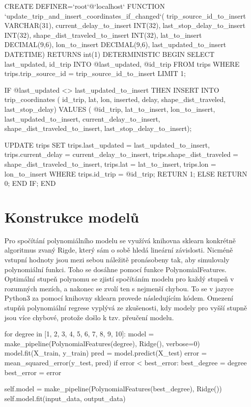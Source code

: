 \begin{code}[frame=none]
CREATE DEFINER=`root`@`localhost` FUNCTION
  `update_trip_and_insert_coordinates_if_changed`(
  trip_source_id_to_insert VARCHAR(31),
  current_delay_to_insert INT(32),
    last_stop_delay_to_insert INT(32),
  shape_dist_traveled_to_insert INT(32),
  lat_to_insert DECIMAL(9,6),
  lon_to_insert DECIMAL(9,6),
  last_updated_to_insert DATETIME) RETURNS int(1)
    DETERMINISTIC
BEGIN
  SELECT last_updated, id_trip
  INTO @last_updated, @id_trip
  FROM trips
  WHERE trips.trip_source_id = trip_source_id_to_insert
  LIMIT 1;


  IF @last_updated <> last_updated_to_insert THEN
    INSERT INTO trip_coordinates (
      id_trip,
      lat,
      lon,
      inserted,
      delay,
      shape_dist_traveled,
      last_stop_delay)
    VALUES (
      @id_trip,
      lat_to_insert,
      lon_to_insert,
      last_updated_to_insert,
      current_delay_to_insert,
      shape_dist_traveled_to_insert,
      last_stop_delay_to_insert);


    UPDATE trips
    SET trips.last_updated = last_updated_to_insert,
      trips.current_delay = current_delay_to_insert,
      trips.shape_dist_traveled = shape_dist_traveled_to_insert,
      trips.lat = lat_to_insert,
      trips.lon = lon_to_insert
    WHERE trips.id_trip = @id_trip;
        RETURN 1;
  ELSE
    RETURN 0;
  END IF;
END
\end{code}




\section{Konstrukce modelů} \label{section:konstrukce_modelu}


Pro spočítání polynomiálního modelu se využívá knihovna sklearn konkrétně algoritmus zvaný Rigde, který sám o sobě hledá lineární závislosti. Nicméně vstupní hodnoty jsou mezi sebou náležitě pronásobeny tak, aby simulovaly polynomiální funkci. Toho se dosáhne pomocí funkce PolynomialFeatures. Optimální stupeň polynomu se zjistí spočítáním modelu pro každý stupeň v rozumných mezích, a nakonec se zvolí ten s nejmenší chybou. To se v jazyce Python3 za pomocí knihovny sklearn provede následujícím kódem. Omezení stupňů polynomiální regrese vyplývá ze zkušenosti, kdy modely pro vyšší stupně jsou více chybové, protože došlo k tzv. přeučení modelu.


\begin{code}[frame=none]
for degree in [1, 2, 3, 4, 5, 6, 7, 8, 9, 10]:
  model = make_pipeline(PolynomialFeatures(degree), Ridge(), verbose=0)
  model.fit(X_train, y_train)
  pred = model.predict(X_test)
  error = mean_squared_error(y_test, pred)
  if error < best_error:
    best_degree = degree
    best_error = error


self.model = make_pipeline(PolynomialFeatures(best_degree), Ridge())
self.model.fit(input_data, output_data)
\end{code}

